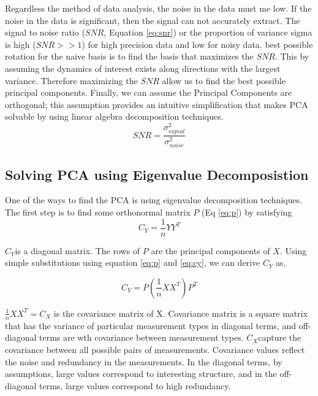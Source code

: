Regardless the method of data analysis, the noise in the data must me low. If the noise in the data is significant, then the signal can not accurately extract.  The signal to noise ratio ($SNR$, Equation \ref{eq:snr}) or the proportion of variance sigma is high ($SNR >> 1$) for high precision data and low for noisy data.  best possible rotation for the naive basis is to find the basis that maximizes the $SNR$. This by assuming the dynamics of interest exists along directions with the largest variance. Therefore maximizing the $SNR$ allow us to find the best possible principal components. Finally, we can assume the Principal Components are orthogonal; this assumption provides an intuitive simplification that makes PCA solvable by using linear algebra decomposition techniques. 
\begin{equation}
SNR = \frac{\sigma^{2}_{signal}}{\sigma^{2}_{noise}}
\label{eq:snr}
\end{equation}

\subsection{Solving PCA using Eigenvalue Decomposistion}


One of the ways to find the PCA is using eigenvalue decomposition techniques. The first step is to find some orthonormal matrix $P$ (Eq \ref{eq:p}) by satisfying 
\begin{equation}
C_Y = \frac{1}{n} YY^{T}
\label{eq:cy}
\end{equation}


 $C_Y$is a diagonal matrix. The rows of $P$ are the principal components of $X$. Using simple substitutions using equation \ref{eq:p} and \ref{eq:cy}, we can derive $C_Y$ as, 

\begin{equation}
C_Y = P(\frac{1}{n}XX^{T})P^{T}
\label{eq:cy1}
\end{equation}

$\frac{1}{n}XX^{T} = C_X$ is the covariance matrix of X. Covariance matrix is a square matrix that has the variance of particular measurement types in diagonal terms, and off-diagonal terms are wth covariance between measurement types.  $C_X$capture the covariance between all possible pairs of measurements. Covariance values reflect the noise and redundancy in the measurements. In the diagonal terms, by assumptions, large values correspond to interesting structure, and in the off-diagonal terms, large values correspond to high redundancy. 

